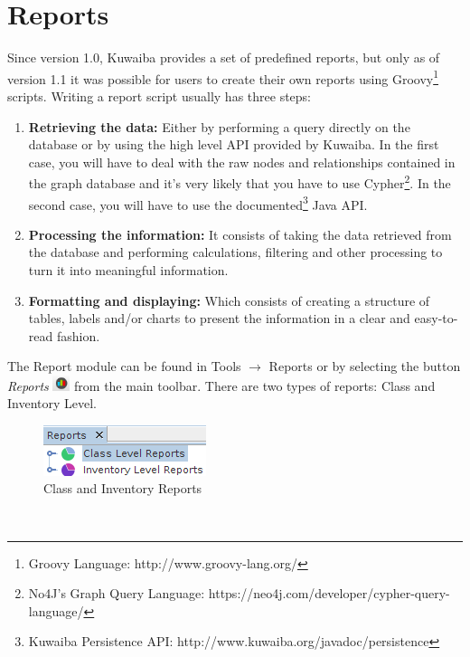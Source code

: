\documentclass[a4paper]{article}
\begin{document}
		\section{Reports}
		Since version 1.0, Kuwaiba provides a set of predefined reports, but only as of version 1.1 it was possible for users to create their own reports using Groovy\footnote{Groovy Language: http://www.groovy-lang.org/} scripts. Writing a report script usually has three steps:
		\begin{enumerate}
			\item \textbf{Retrieving the data:} Either by performing a query directly on the database or by using the high level API provided by Kuwaiba. In the first case, you will have to deal with the raw nodes and relationships contained in the graph database and it's very likely that you have to use Cypher\footnote{No4J's Graph Query Language: https://neo4j.com/developer/cypher-query-language/}. In the second case, you will have to use the documented\footnote{Kuwaiba Persistence API: http://www.kuwaiba.org/javadoc/persistence} Java API.
			\item \textbf{Processing the information:} It consists of taking the data retrieved from the database and performing calculations, filtering and other processing to turn it into meaningful information.
			\item \textbf{Formatting and displaying:} Which consists of creating a structure of tables, labels and/or charts to present the information in a clear and easy-to-read fashion.
		\end{enumerate}
		The Report module can be found in Tools $\rightarrow$ Reports or by selecting the button \textit{Reports} \includegraphics[width=0.5cm]{img/icon_reports.png} from the main toolbar.  There are two types of reports: Class and Inventory Level.
		\begin{figure}[h!]
			\centering
			\includegraphics[scale=0.8]{img/reports_report_types.png}
			\caption{Class and Inventory Reports}
			\label{fig:reports_report_types}
		\end{figure}\\
\end{document}
